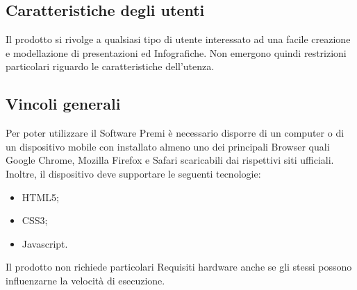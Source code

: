 {\subsection{Caratteristiche degli utenti}{
	Il prodotto si rivolge a qualsiasi tipo di utente interessato ad una facile creazione e modellazione di presentazioni ed Infografiche. Non emergono quindi restrizioni particolari riguardo le caratteristiche dell'utenza.
}
\subsection{Vincoli generali}{
	Per poter utilizzare il Software Premi è necessario disporre di un computer o di un dispositivo mobile con installato almeno uno dei principali Browser quali Google Chrome, Mozilla Firefox e Safari scaricabili dai rispettivi siti ufficiali. Inoltre, il dispositivo deve supportare le seguenti tecnologie:
	\begin{itemize}
		\item HTML5;
		\item CSS3;
		\item Javascript.
	\end{itemize}
	Il prodotto non richiede particolari Requisiti hardware anche se gli stessi possono influenzarne la velocità di esecuzione.
	}
}